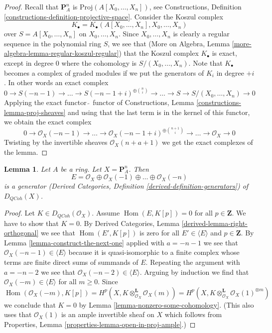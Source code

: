 \documentclass{stacks-project}
\theoremstyle{plain}
\newtheorem{lemma}[subsection]{Lemma}
\theoremstyle{definition}
\theoremstyle{remark}
\numberwithin{equation}{subsection}
\def\Hom{\mathop{\mathrm{Hom}}\nolimits}
\def\QCoh{\mathit{QCoh}}
\begin{document}
\begin{proof}
Recall that $\mathbf{P}^n_A$ is $\text{Proj}(A[X_0, \ldots, X_n])$, see
Constructions, Definition \ref{constructions-definition-projective-space}.
Consider the Koszul complex
$$
K_\bullet = K_\bullet(A[X_0, \ldots, X_n], X_0, \ldots, X_n)
$$
over $S = A[X_0, \ldots, X_n]$ on $X_0, \ldots, X_n$.
Since $X_0, \ldots, X_n$ is clearly a regular sequence in the
polynomial ring $S$, we see that
(More on Algebra, Lemma \ref{more-algebra-lemma-regular-koszul-regular})
that the Koszul complex $K_\bullet$ is exact, except in degree $0$
where the cohomology is $S/(X_0, \ldots, X_n)$.
Note that $K_\bullet$ becomes a complex of graded modules if we
put the generators of $K_i$ in degree $+i$. In other words an
exact complex
$$
0 \to S(-n - 1) \to \ldots \to S(-n - 1 + i)^{\oplus {n \choose i}} \to \ldots
\to S \to S/(X_0, \ldots, X_n) \to 0
$$
Applying the exact functor $\tilde{\ }$ functor of Constructions, 
Lemma \ref{constructions-lemma-proj-sheaves} and using that
the last term is in the kernel of this functor,
we obtain the exact complex
$$
0 \to \mathcal{O}_X(-n - 1) \to \ldots
\to \mathcal{O}_X(-n - 1 + i)^{\oplus {n + 1 \choose i}} \to
\ldots \to \mathcal{O}_X \to 0
$$
Twisting by the invertible sheaves $\mathcal{O}_X(n + a + 1)$
we get the exact complexes of the lemma.
\end{proof}

\begin{lemma}
\label{lemma-generator-P1}
Let $A$ be a ring. Let $X = \mathbf{P}^n_A$. Then
$$
E =
\mathcal{O}_X \oplus \mathcal{O}_X(-1) \oplus \ldots \oplus \mathcal{O}_X(-n)
$$
is a generator
(Derived Categories, Definition \ref{derived-definition-generators})
of $D_\QCoh(X)$.
\end{lemma}

\begin{proof}
Let $K \in D_\QCoh(\mathcal{O}_X)$. Assume
$\Hom(E, K[p]) = 0$ for all $p \in \mathbf{Z}$.
We have to show that $K = 0$.
By Derived Categories, Lemma
\ref{derived-lemma-right-orthogonal}
we see that $\Hom(E', K[p])$ is zero for all $E' \in \langle E \rangle$
and $p \in \mathbf{Z}$.
By Lemma \ref{lemma-construct-the-next-one}
applied with $a = -n - 1$
we see that $\mathcal{O}_X(-n - 1) \in \langle E \rangle$
because it is quasi-isomorphic to a finite complex
whose terms are finite direct sums of summands of $E$.
Repeating the argument with $a = -n - 2$ we see that
$\mathcal{O}_X(-n - 2) \in \langle E \rangle$.
Arguing by induction we find that $\mathcal{O}_X(-m) \in \langle E \rangle$
for all $m \geq 0$.
Since
$$
\Hom(\mathcal{O}_X(-m), K[p]) =
H^p(X, K \otimes_{\mathcal{O}_X}^\mathbf{L} \mathcal{O}_X(m)) =
H^p(X, K \otimes_{\mathcal{O}_X}^\mathbf{L} \mathcal{O}_X(1)^{\otimes m})
$$
we conclude that $K = 0$ by Lemma \ref{lemma-nonzero-some-cohomology}.
(This also uses that $\mathcal{O}_X(1)$ is an ample
invertible sheaf on $X$ which follows from
Properties, Lemma \ref{properties-lemma-open-in-proj-ample}.)
\end{proof}
\end{document}
